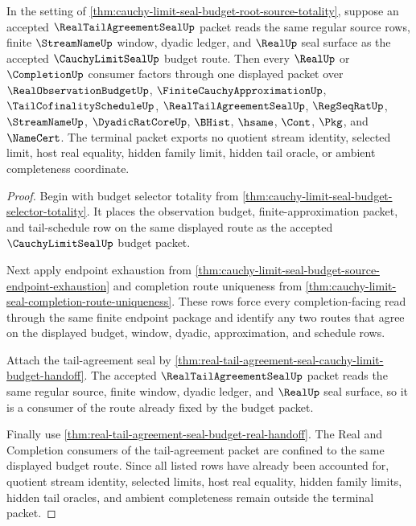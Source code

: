 \begin{theorem}
\label{thm:cauchy-limit-seal-budget-real-tail-agreement-terminality}
In the setting of \autoref{thm:cauchy-limit-seal-budget-root-source-totality}, suppose an accepted $\RealTailAgreementSealUp$ packet reads the same regular source rows, finite $\StreamNameUp$ window, dyadic ledger, and $\RealUp$ seal surface as the accepted $\CauchyLimitSealUp$ budget route. Then every $\RealUp$ or $\CompletionUp$ consumer factors through one displayed packet over $\RealObservationBudgetUp$, $\FiniteCauchyApproximationUp$, $\TailCofinalityScheduleUp$, $\RealTailAgreementSealUp$, $\RegSeqRatUp$, $\StreamNameUp$, $\DyadicRatCoreUp$, $\BHist$, $\hsame$, $\Cont$, $\Pkg$, and $\NameCert$. The terminal packet exports no quotient stream identity, selected limit, host real equality, hidden family limit, hidden tail oracle, or ambient completeness coordinate.
\end{theorem}
\begin{proof}
Begin with budget selector totality from \autoref{thm:cauchy-limit-seal-budget-selector-totality}. It places the observation budget, finite-approximation packet, and tail-schedule row on the same displayed route as the accepted $\CauchyLimitSealUp$ budget packet.

Next apply endpoint exhaustion from \autoref{thm:cauchy-limit-seal-budget-source-endpoint-exhaustion} and completion route uniqueness from \autoref{thm:cauchy-limit-seal-completion-route-uniqueness}. These rows force every completion-facing read through the same finite endpoint package and identify any two routes that agree on the displayed budget, window, dyadic, approximation, and schedule rows.

Attach the tail-agreement seal by \autoref{thm:real-tail-agreement-seal-cauchy-limit-budget-handoff}. The accepted $\RealTailAgreementSealUp$ packet reads the same regular source, finite window, dyadic ledger, and $\RealUp$ seal surface, so it is a consumer of the route already fixed by the budget packet.

Finally use \autoref{thm:real-tail-agreement-seal-budget-real-handoff}. The Real and Completion consumers of the tail-agreement packet are confined to the same displayed budget route. Since all listed rows have already been accounted for, quotient stream identity, selected limits, host real equality, hidden family limits, hidden tail oracles, and ambient completeness remain outside the terminal packet.
\end{proof}


